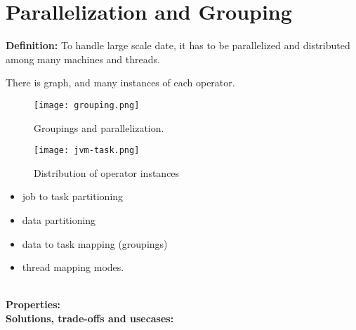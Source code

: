 \section{Parallelization and Grouping}
\label{sec:parallelization}


\noindent\textbf{Definition:} To handle large scale date, it has to be parallelized and distributed among many machines and threads. 

There is graph, and many instances of each operator. 

\begin{figure}[h]
	\centering
	\texttt{[image: grouping.png]}
	\caption{ Groupings and parallelization.}
	\label{fig:grouping}
\end{figure}

\begin{figure}[h]
	\centering
	\texttt{[image: jvm-task.png]}
	\caption{ Distribution of operator instances}
	\label{fig:distribution}
\end{figure}


\begin{itemize}
	\item job to task partitioning
	\item data partitioning
	\item data to task mapping (groupings)
	\item thread mapping modes.
	
\end{itemize}

\noindent \textbf{\\Properties:}
\noindent \textbf{\\Solutions, trade-offs and usecases:}

